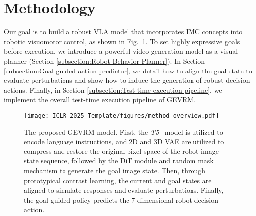 \section{Methodology}
Our goal is to build a robust VLA model that incorporates IMC concepts into robotic visuomotor control, as shown in Fig.~\ref{fig:method_overview}. 
To set highly expressive goals before execution, we introduce a powerful video generation model as a visual planner (Section \ref{subsection:Robot Behavior Planner}). 
In Section \ref{subsection:Goal-guided action predictor}, we detail how to align the goal state to evaluate perturbations and show how to induce the generation of robust decision actions. 
Finally, in Section \ref{subsection:Test-time execution pipeline}, we implement the overall test-time execution pipeline of GEVRM.
\begin{figure}[tbp]
\centering
\texttt{[image: ICLR\_2025\_Template/figures/method\_overview.pdf]}
\caption{
The proposed GEVRM model.
First, the \textit{T5}~\citep{2020t5} model is utilized to encode language instructions, and 2D and 3D VAE are utilized to compress and restore the original pixel space of the robot image state sequence, followed by the DiT module and random mask mechanism to generate the goal image state.
Then, through prototypical contrast learning, the current and goal states are aligned to simulate responses and evaluate perturbations.
Finally, the goal-guided policy predicts the 7-dimensional robot decision action.
} 
  \label{fig:method_overview}
\end{figure}


